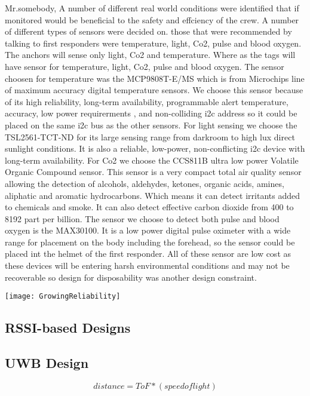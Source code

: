 \documentclass[sigconf]{acmart}
\begin{document}
Mr.somebody, A number of different real world conditions were identified that if monitored would be beneficial to the safety and effciency of the crew. A number of different types of sensors were decided on. those that were recommended by talking to first responders were temperature, light, Co2, pulse and blood oxygen. The anchors will sense only light, Co2 and temperature. Where as the tags will have sensor for temperature, light, Co2, pulse and blood oxygen. The sensor choosen for temperature was the MCP9808T-E/MS which is from Microchips line of maximum accuracy digital temperature sensors. We choose this sensor because of its high reliability, long-term availability, programmable alert temperature, accuracy, low power requirerments , and non-colliding i2c address so it could be placed on the same i2c bus as the other sensors. For light sensing we choose the TSL2561-TCT-ND for its large sensing range from darkroom to high lux direct sunlight conditions. It is also a reliable, low-power, non-conflicting i2c device with long-term availability. For Co2 we choose the CCS811B ultra low power Volatile Organic Compound sensor. This sensor is a very compact total air quality sensor allowing the detection of alcohols, aldehydes, ketones, organic acids, amines, aliphatic and aromatic hydrocarbons. Which means it can detect irritants added to chemicals and smoke. It can also detect effective carbon dioxide from 400 to 8192 part per billion. The sensor we choose to detect both pulse and blood oxygen is the MAX30100. It is a low power digital pulse oximeter with a wide range for placement on the body including the forehead, so the sensor could be placed int the helmet of the first responder. All of these sensor are low cost as these devices will be entering harsh environmental conditions and may not be recoverable so design for disposability was another design constraint. 
    
    \texttt{[image: GrowingReliability]}

\subsection{RSSI-based Designs}

\subsection{UWB Design}

\begin{equation}
 distance=ToF*(speed of light)
\end{equation}
\end{document}
